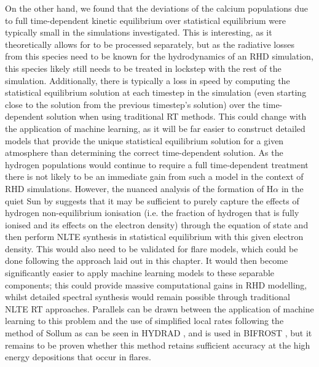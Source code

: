 On the other hand, we found that the deviations of the calcium populations due to full time-dependent kinetic equilibrium over statistical equilibrium were typically small in the simulations investigated.
This is interesting, as it theoretically allows for \Caii{} to be processed separately, but as the radiative losses from this species need to be known for the hydrodynamics of an RHD simulation, this species likely still needs to be treated in lockstep with the rest of the simulation.
Additionally, there is typically a loss in speed by computing the statistical equilibrium solution at each timestep in the simulation (even starting close to the solution from the previous timestep's solution) over the time-dependent solution when using traditional RT methods.
This could change with the application of machine learning, as it will be far easier to construct detailed models that provide the unique  statistical equilibrium solution for a given atmosphere than determining the correct time-dependent solution.
As the hydrogen populations would continue to require a full time-dependent treatment there is not likely to be an immediate gain from such a model in the context of RHD simulations.
However, the nuanced analysis of the formation of H$\alpha$ in the quiet Sun by \citet{Leenaarts2012a} suggests that it may be sufficient to purely capture the effects of hydrogen non-equilibrium ionisation (i.e. the fraction of hydrogen that is fully ionised and its effects on the electron density) through the equation of state and then perform NLTE synthesis in statistical equilibrium with this given electron density.
This would also need to be validated for flare models, which could be done following the approach laid out in this chapter.
It would then become significantly easier to apply machine learning models to these separable components; this could provide massive computational gains in RHD modelling, whilst detailed spectral synthesis would remain possible through traditional NLTE RT approaches.
Parallels can be drawn between the application of machine learning to this problem and the use of simplified local rates following the method of Sollum \NeedRef{} as can be seen in HYDRAD \citep{Reep2019}, and is used in BIFROST \citep{Gudiksen2011, Leenaarts2007}, but it remains to be proven whether this method retains sufficient accuracy at the high energy depositions that occur in flares.


